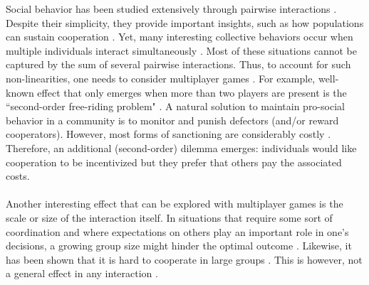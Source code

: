 \documentclass[11pt]{article}
\theoremstyle{plainCl1}
\theoremstyle{plainCl2}
\begin{document}
Social behavior has been studied extensively through pairwise interactions \cite{Hofbauer:book:1998}. Despite their simplicity, they provide important insights, such as how populations can sustain cooperation \cite{Axelrod:book:1984, Nowak:Science:2006,  Nowak:book:2011}. 
Yet, many interesting collective behaviors occur when multiple individuals interact simultaneously \cite{Palm:JMB:1984, Skyrms:book:2003, Pacheco:PRSB:2009, Archetti:EL:2011, Archetti:JTB:2012, Gokhale:DGAA:2014, Hilbe:JTB:2015, Venkateswaran:PRSB:2019}.
Most of these situations cannot be captured by the sum of several pairwise interactions. Thus, to account for such non-linearities, one needs to consider multiplayer games \cite{Gokhale:DGAA:2014}. For example, well-known effect that only emerges when more than two players are present is the ``second-order free-riding problem" \cite{Fowler:PNAS:2005}. A natural solution to maintain pro-social behavior in a community is to monitor and punish defectors (and/or reward cooperators). However, most forms of sanctioning are considerably costly \cite{Henrich:Science:2006}. Therefore, an additional (second-order) dilemma 
emerges: individuals would like cooperation to be incentivized but they prefer that others pay the associated costs.
\\ \\
\noindent 
Another interesting effect that can be explored with multiplayer games is the scale or size of the interaction itself. In situations that require some sort of coordination and where expectations on others play an important role in one's decisions, a growing group size might hinder the optimal outcome \cite{Skyrms:book:2003}. Likewise, it has been shown that it is hard to cooperate in large groups \cite{Santos:PNAS:2011, Hilbe:JTB:2015}. This is however, not a general effect in any interaction \cite{gokhale:JTB:2011}. 
\end{document}
